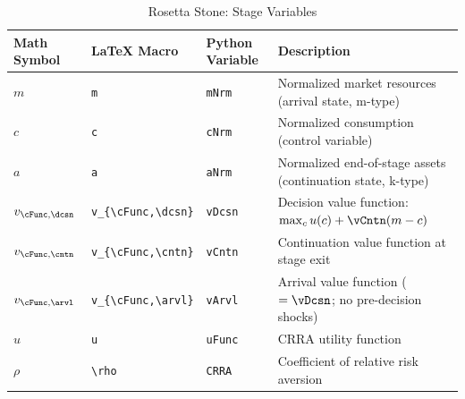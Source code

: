 \documentclass[titlepage, headings=optiontotocandhead]{econark}
\begin{document}
\begin{table}[h]
\caption{Rosetta Stone:  Stage Variables}
\label{tab:rosetta-cons-noshocks}
\begin{center}
\begin{tabular}{l|l|l|l}
Math Symbol & \LaTeX{} Macro & Python Variable & Description \\
\hline
$m$        & \verb|m|        & \texttt{mNrm}        & Normalized market resources (arrival state, m-type) \\
$c$        & \verb|c|        & \texttt{cNrm}        & Normalized consumption (control variable) \\
$a$        & \verb|a|        & \texttt{aNrm}        & Normalized end-of-stage assets (continuation state, k-type) \\
$v_{\cFunc,\dcsn}$ & \verb|v_{\cFunc,\dcsn}| & \texttt{vDcsn} & Decision value function: $\max_{c} u(c) + \vCntn(m - c)$ \\
$v_{\cFunc,\cntn}$ & \verb|v_{\cFunc,\cntn}| & \texttt{vCntn} & Continuation value function at stage exit \\
$v_{\cFunc,\arvl}$ & \verb|v_{\cFunc,\arvl}| & \texttt{vArvl} & Arrival value function ($= \vDcsn$; no pre-decision shocks) \\
$u$       & \verb|u|       & \texttt{uFunc}       & CRRA utility function \\
$\rho$        & \verb|\rho|        & \texttt{CRRA}        & Coefficient of relative risk aversion \\
\hline
\end{tabular}
\end{center}
\end{table}
\end{document}
